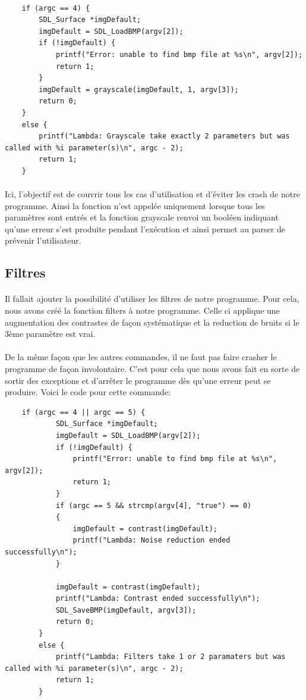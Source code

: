 \documentclass{article}
\begin{document}
\begin{lstlisting}

	if (argc == 4) {
		SDL_Surface *imgDefault;
		imgDefault = SDL_LoadBMP(argv[2]);
		if (!imgDefault) {
			printf("Error: unable to find bmp file at %s\n", argv[2]);
			return 1;
		}
		imgDefault = grayscale(imgDefault, 1, argv[3]);
		return 0;
	}
	else {
		printf("Lambda: Grayscale take exactly 2 parameters but was called with %i parameter(s)\n", argc - 2);
		return 1;
	}
\end{lstlisting}

\paragraph{}Ici, l'objectif est de couvrir tous les cas d'utilisation et d'éviter les crash de notre programme. Ainsi la fonction n'est appelée uniquement lorsque tous les paramètres sont entrés et la fonction grayscale renvoi un booléen indiquant qu'une erreur s'est produite pendant l'exécution et ainsi permet au parser de prévenir l'utilisateur.

\subsection{Filtres}

\paragraph{}Il fallait ajouter la possibilité d'utiliser les filtres de notre programme. Pour cela, nous avons créé la fonction filters à notre programme. Celle ci applique une augmentation des contrastes de façon systématique et la reduction de bruits si le 3ème paramètre est vrai.

\paragraph{}De la même façon que les autres commandes, il ne faut pas faire crasher le programme de façon involontaire. C'est pour cela que nous avons fait en sorte de sortir des exceptions et d'arrêter le programme dès qu'une erreur peut se produire. Voici le code pour cette commande:

\begin{lstlisting}
	if (argc == 4 || argc == 5) {
			SDL_Surface *imgDefault;
			imgDefault = SDL_LoadBMP(argv[2]);
			if (!imgDefault) {
				printf("Error: unable to find bmp file at %s\n", argv[2]);
				return 1;
			}
			if (argc == 5 && strcmp(argv[4], "true") == 0)
			{
				imgDefault = contrast(imgDefault);
				printf("Lambda: Noise reduction ended successfully\n");
			}
			
			imgDefault = contrast(imgDefault);
			printf("Lambda: Contrast ended successfully\n");
			SDL_SaveBMP(imgDefault, argv[3]);
			return 0;
		}
		else {
			printf("Lambda: Filters take 1 or 2 paramaters but was called with %i parameter(s)\n", argc - 2);
			return 1;
		}
\end{lstlisting}
\end{document}
